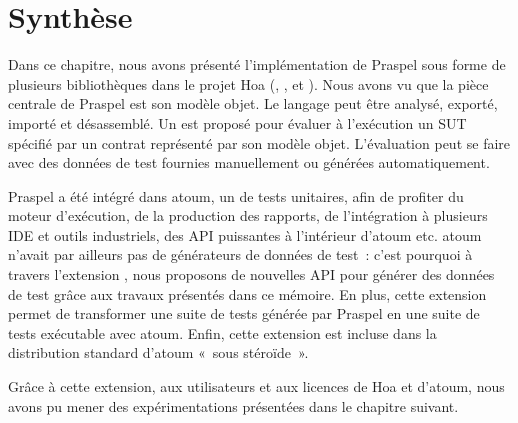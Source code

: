 \section{Synthèse}
\label{section:tools:summary}

Dans ce chapitre, nous avons présenté l'implémentation de Praspel sous forme de
plusieurs bibliothèques dans le projet Hoa (,
,  et
). Nous avons vu que la pièce centrale de Praspel est
son modèle objet. Le langage peut être analysé, exporté, importé et désassemblé.
Un  est proposé pour évaluer à l'exécution
un SUT spécifié par un contrat représenté par son modèle objet. L'évaluation
peut se faire avec des données de test fournies manuellement ou générées
automatiquement.

Praspel a été intégré dans atoum, un  de tests unitaires,
afin de profiter du moteur d'exécution, de la production des rapports, de
l'intégration à plusieurs IDE et outils industriels, des API puissantes à
l'intérieur d'atoum etc. atoum n'avait par ailleurs pas de générateurs de
données de test~: c'est pourquoi à travers l'extension
, nous proposons de nouvelles API pour
générer des données de test grâce aux travaux présentés dans ce mémoire. En
plus, cette extension permet de transformer une suite de tests générée par
Praspel en une suite de tests exécutable avec atoum. Enfin, cette extension est
incluse dans la distribution standard d'atoum «~sous stéroïde~».

Grâce à cette extension, aux utilisateurs et aux licences
 de Hoa et d'atoum, nous avons pu mener des
expérimentations présentées dans le chapitre suivant.
